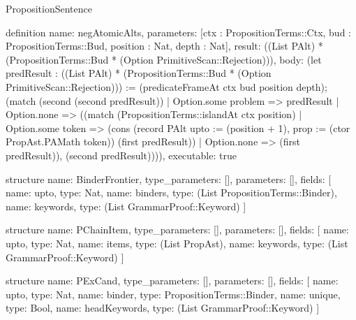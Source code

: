 \begin{lexlean}{PropositionSentence}
\begin{semanticmodule}
definition{
  name: negAtomicAlts,
  parameters: [ctx : PropositionTerms::Ctx, bud : PropositionTerms::Bud, position : Nat, depth : Nat],
  result: ((List PAlt) * (PropositionTerms::Bud * (Option PrimitiveScan::Rejection))),
  body: (let predResult : ((List PAlt) * (PropositionTerms::Bud * (Option PrimitiveScan::Rejection))) := (predicateFrameAt ctx bud position depth); (match (second (second predResult))
    | Option.some problem => predResult
    | Option.none => ((match (PropositionTerms::islandAt ctx position)
        | Option.some token => (cons (record PAlt {upto := (position + 1), prop := (ctor PropAst.PAMath token)}) (first predResult))
        | Option.none => (first predResult)), (second predResult)))),
  executable: true
}

structure{
  name: BinderFrontier,
  type_parameters: [],
  parameters: [],
  fields: [
    {name: upto, type: Nat},
    {name: binders, type: (List PropositionTerms::Binder)},
    {name: keywords, type: (List GrammarProof::Keyword)}
  ]
}

structure{
  name: PChainItem,
  type_parameters: [],
  parameters: [],
  fields: [
    {name: upto, type: Nat},
    {name: items, type: (List PropAst)},
    {name: keywords, type: (List GrammarProof::Keyword)}
  ]
}

structure{
  name: PExCand,
  type_parameters: [],
  parameters: [],
  fields: [
    {name: upto, type: Nat},
    {name: binder, type: PropositionTerms::Binder},
    {name: unique, type: Bool},
    {name: headKeywords, type: (List GrammarProof::Keyword)}
  ]
}


\end{semanticmodule}
\end{lexlean}
